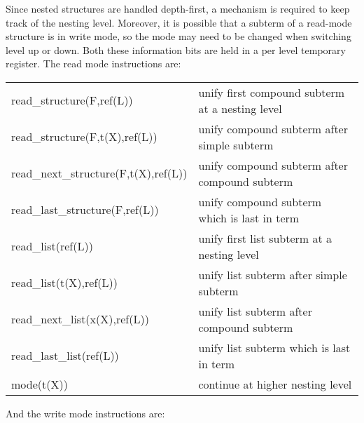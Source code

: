 Since nested structures are handled depth-first, a mechanism is required
to keep track of the nesting level. Moreover, it is possible that a subterm
of a read-mode structure is in write mode, so the mode may need to be changed
when switching level up or down. Both these information bits are held in
a per level temporary register.
The read mode instructions are:

\begin{tabular}{|p{}|p{}|}
\hline
read_structure(F,ref(L))        & unify first compound subterm at a nesting level \\
read_structure(F,t(X),ref(L))   & unify compound subterm after simple subterm \\
read_next_structure(F,t(X),ref(L)) & unify compound subterm after compound subterm \\
read_last_structure(F,ref(L))   & unify compound subterm which is last in term \\
\hline
read_list(ref(L))               & unify first list subterm at a nesting level \\
read_list(t(X),ref(L))          & unify list subterm after simple subterm \\
read_next_list(x(X),ref(L))     & unify list subterm after compound subterm \\
read_last_list(ref(L))          & unify list subterm which is last in term \\
\hline
mode(t(X))                      & continue at higher nesting level \\
\hline
\end{tabular}

And the write mode instructions are:

